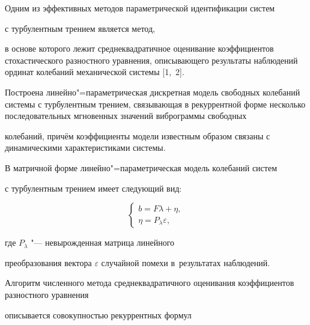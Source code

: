  

\maketitle









Одним из эффективных методов параметрической идентификации систем

с турбулентным трением является метод,

 в основе которого лежит  среднеквадратичное оценивание коэффициентов стохастического разностного уравнения, описывающего результаты наблюдений ординат колебаний механической системы [1,~2].

 Построена линейно"=параметрическая дискретная модель свободных колебаний системы с турбулентным трением, связывающая в рекуррентной форме несколько последовательных мгновенных значений виброграммы свободных

 колебаний, причём коэффициенты модели известным образом связаны с динамическими характеристиками системы.

 В матричной форме линейно"=параметрическая модель колебаний систем

 с турбулентным трением имеет следующий вид:



\begin{equation}

    \label{math/1}

    \left\{

     \begin{array}{l}

        b=F\lambda+\eta, \\

        \eta=P_{\lambda}\varepsilon, 

     \end{array}

     \right.

\end{equation}

где  $P_{\lambda}$ "--- невырожденная матрица линейного

преобразования вектора  $\varepsilon$ случайной помехи в~результатах наблюдений. 

Алгоритм численного метода среднеквадратичного оценивания коэффициентов разностного уравнения

описывается совокупностью рекуррентных формул 

